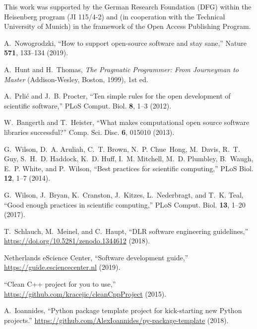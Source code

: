 \documentclass[@CLASSOPTIONS@]{tumarticle}
\begin{document}
This work was supported by the German Research Foundation (DFG) within the
Heisenberg program (JI 115/4-2) and (in cooperation with the Technical
University of Munich) in the framework of the Open Access Publishing Program.

\begin{thebibliography}{10}
  \newcommand{\enquote}[1]{``#1''}

  A.~Nowogrodzki, \enquote{How to support open-source software and stay sane,}
  Nature \textbf{571}, 133--134 (2019).

  A.~Hunt and H.~Thomas, \emph{The Pragmatic Programmer: From Journeyman to
    Master} (Addison-Wesley, Boston, 1999), 1st ed.

  A.~Prli{\'c} and J.~B. Procter, \enquote{Ten simple rules for the open
    development of scientific software,} PLoS Comput. Biol. \textbf{8}, 1--3
  (2012).

  W.~Bangerth and T.~Heister, \enquote{What makes computational open source
    software libraries successful?} Comp. Sci. Disc. \textbf{6}, 015010 (2013).

  G.~Wilson, D.~A. Aruliah, C.~T. Brown, N.~P. Chue~Hong, M.~Davis, R.~T. Guy,
  S.~H.~D. Haddock, K.~D. Huff, I.~M. Mitchell, M.~D. Plumbley, B.~Waugh, E.~P.
  White, and P.~Wilson, \enquote{Best practices for scientific computing,} PLoS
  Biol. \textbf{12}, 1--7 (2014).

  G.~Wilson, J.~Bryan, K.~Cranston, J.~Kitzes, L.~Nederbragt, and T.~K. Teal,
  \enquote{Good enough practices in scientific computing,} PLoS Comput. Biol.
  \textbf{13}, 1--20 (2017).

  T.~Schlauch, M.~Meinel, and C.~Haupt, \enquote{{DLR} software engineering
    guidelines,} \url{https://doi.org/10.5281/zenodo.1344612} (2018).

  {Netherlands eScience Center}, \enquote{Software development guide,}
  \url{https://guide.esciencecenter.nl} (2019).

  \enquote{Clean {C++} project for you to use,}
  \url{https://github.com/kracejic/cleanCppProject} (2015).

  A.~Ioannides, \enquote{Python package template project for kick-starting new
    {Python} projects.}
  \url{https://github.com/AlexIoannides/py-package-template} (2018).


\end{thebibliography}
\end{document}
